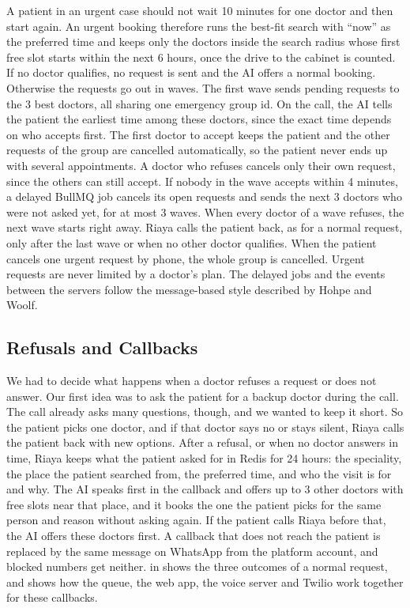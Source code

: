 A patient in an urgent case should not wait 10 minutes for one doctor and then start again. An urgent booking therefore runs the best-fit search with ``now'' as the preferred time and keeps only the doctors inside the search radius whose first free slot starts within the next 6 hours, once the drive to the cabinet is counted. If no doctor qualifies, no request is sent and the AI offers a normal booking. Otherwise the requests go out in waves. The first wave sends pending requests to the 3 best doctors, all sharing one emergency group id. On the call, the AI tells the patient the earliest time among these doctors, since the exact time depends on who accepts first. The first doctor to accept keeps the patient and the other requests of the group are cancelled automatically, so the patient never ends up with several appointments. A doctor who refuses cancels only their own request, since the others can still accept. If nobody in the wave accepts within 4 minutes, a delayed BullMQ job cancels its open requests and sends the next 3 doctors who were not asked yet, for at most 3 waves. When every doctor of a wave refuses, the next wave starts right away. Riaya calls the patient back, as for a normal request, only after the last wave or when no other doctor qualifies. When the patient cancels one urgent request by phone, the whole group is cancelled. Urgent requests are never limited by a doctor's plan. The delayed jobs and the events between the servers follow the message-based style described by Hohpe and Woolf.

\subsection{Refusals and Callbacks}
\label{subsec:rejection-handling}

We had to decide what happens when a doctor refuses a request or does not answer. Our first idea was to ask the patient for a backup doctor during the call. The call already asks many questions, though, and we wanted to keep it short. So the patient picks one doctor, and if that doctor says no or stays silent, Riaya calls the patient back with new options. After a refusal, or when no doctor answers in time, Riaya keeps what the patient asked for in Redis for 24 hours: the speciality, the place the patient searched from, the preferred time, and who the visit is for and why. The AI speaks first in the callback and offers up to 3 other doctors with free slots near that place, and it books the one the patient picks for the same person and reason without asking again. If the patient calls Riaya before that, the AI offers these doctors first. A callback that does not reach the patient is replaced by the same message on WhatsApp from the platform account, and blocked numbers get neither.  in  shows the three outcomes of a normal request, and  shows how the queue, the web app, the voice server and Twilio work together for these callbacks.

